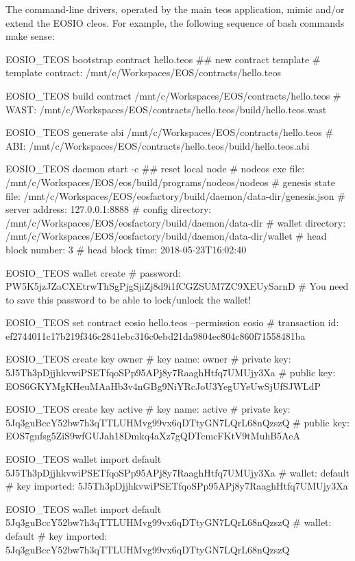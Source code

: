 The command-\/line drivers, operated by the main {\ttfamily teos} application, mimic and/or extend the E\+O\+S\+IO {\ttfamily cleos}. For example, the following sequence of bash commands make sense\+: 
\begin{DoxyCode}
$ $EOSIO\_TEOS bootstrap contract hello.teos     ## new contract template
#  template contract: /mnt/c/Workspaces/EOS/contracts/hello.teos

$ $EOSIO\_TEOS build contract /mnt/c/Workspaces/EOS/contracts/hello.teos
#  WAST: /mnt/c/Workspaces/EOS/contracts/hello.teos/build/hello.teos.wast

$ $EOSIO\_TEOS generate abi /mnt/c/Workspaces/EOS/contracts/hello.teos
#  ABI: /mnt/c/Workspaces/EOS/contracts/hello.teos/build/hello.teos.abi

$ $EOSIO\_TEOS daemon start -c                   ## reset local node
#  nodeos exe file: /mnt/c/Workspaces/EOS/eos/build/programs/nodeos/nodeos
#  genesis state file: /mnt/c/Workspaces/EOS/eosfactory/build/daemon/data-dir/genesis.json
#   server address: 127.0.0.1:8888
#  config directory: /mnt/c/Workspaces/EOS/eosfactory/build/daemon/data-dir
#  wallet directory: /mnt/c/Workspaces/EOS/eosfactory/build/daemon/data-dir/wallet
#  head block number: 3
#  head block time: 2018-05-23T16:02:40

$ $EOSIO\_TEOS wallet create
#         password: PW5K5jzJZaCXEtrwThSgPjgSjiZj8d9i1fCGZSUM7ZC9XEUySarnD
#  You need to save this password to be able to lock/unlock the wallet!

$ $EOSIO\_TEOS set contract eosio hello.teos --permission eosio
#   transaction id: ef2744011c17b219f346c2841ebc316c0ebd21da9804ec804c860f71558481ba

$ $EOSIO\_TEOS create key owner
#         key name: owner
#      private key: 5J5Th3pDjjhkvwiPSETfqoSPp95APj8y7RaaghHtfq7UMUjy3Xa
#       public key: EOS6GKYMgKHeuMAaHb3v4nGBg9NiYRcJoU3YegUYeUwSjUfSJWLdP

$ $EOSIO\_TEOS create key active
#         key name: active
#      private key: 5Jq3guBccY52bw7h3qTTLUHMvg99vx6qDTtyGN7LQrL68nQzszQ
#       public key: EOS7gnfsg5ZiS9wfGUJah18Dmkq4aXz7gQDTcmcFKtV9tMuhB5AeA

$ $EOSIO\_TEOS wallet import default 5J5Th3pDjjhkvwiPSETfqoSPp95APj8y7RaaghHtfq7UMUjy3Xa
#           wallet: default
#     key imported: 5J5Th3pDjjhkvwiPSETfqoSPp95APj8y7RaaghHtfq7UMUjy3Xa

$ $EOSIO\_TEOS wallet import default 5Jq3guBccY52bw7h3qTTLUHMvg99vx6qDTtyGN7LQrL68nQzszQ
#           wallet: default
#     key imported: 5Jq3guBccY52bw7h3qTTLUHMvg99vx6qDTtyGN7LQrL68nQzszQ


\end{DoxyCode}
